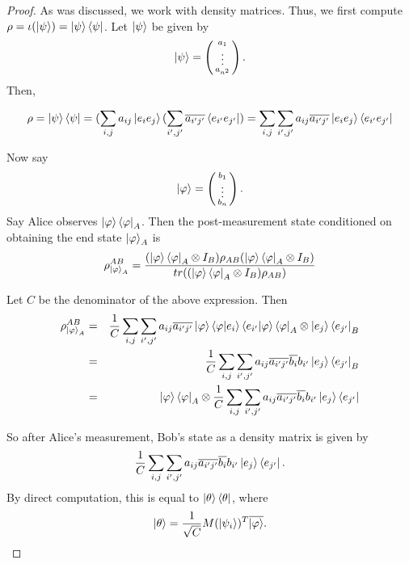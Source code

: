 \begin{proof}
As was discussed, we work with density matrices.  Thus, we first compute $\rho=\iota(\ket{\psi})=\ket{\psi}\bra{\psi}$.  Let $\ket{\psi}$ be given by 
\begin{equation}
\ket{\psi}=\left(\begin{smallmatrix}a_1\\ \vdots \\a_{n^2}\end{smallmatrix}\right).
\end{equation}
Then, 

\begin{equation}
\rho=\ket{\psi}\bra{\psi}=(\sum_{i,j} a_{ij}\ket{e_i e_j}(\sum_{i',j'} \overline{a_{i'j'}}\bra{e_{i'} e_{j'}})=\sum_{i,j} \sum_{i',j'} a_{ij} \overline{a_{i'j'}}\ket{e_i e_j}\bra{e_{i'} e_{j'}}   
\end{equation}

Now say
\begin{equation}
\ket{\varphi}=\left(\begin{smallmatrix}b_1\\ \vdots \\b_n\end{smallmatrix}\right).
\end{equation}
Say Alice observes $\ket{\varphi}\bra{\varphi}_A$.
Then the post-measurement state conditioned on obtaining the end state $\ket{\varphi}_A$ is
\begin{equation}
\rho_{\ket{\varphi}_A}^{AB}=\frac{(\ket{\varphi}\bra{\varphi}_A \otimes I_B)\rho_{AB}(\ket{\varphi}\bra{\varphi}_A \otimes I_B)}{tr((\ket{\varphi}\bra{\varphi}_A \otimes I_B)\rho_{AB})}
\end{equation}

Let $C$ be the denominator of the above expression. Then 
\begin{eqnarray}
\rho_{\ket{\varphi}_A}^{AB}&=&\frac{1}{C} \sum_{i,j} \sum_{{i'}, {j'}} a_{ij} \overline{a_{i'j'}}\ket{\varphi}\braket{\varphi|e_i}\braket{e_{i'}|\varphi}\bra{\varphi}_A \otimes \ket{e_j}\bra{e_{j'}}_B\\
&=&\frac{1}{C} \sum_{i,j} \sum_{{i'}, {j'}} a_{ij} \overline{a_{i'j'}}\overline{b_i}b_{i'}\ket{e_j}\bra{e_{j'}}_B\\
&=&\ket{\varphi}\bra{\varphi}_A \otimes \frac{1}{C} \sum_{i,j} \sum_{{i'}, {j'}} a_{ij} \overline{a_{i'j'}}\overline{b_i}b_{i'}\ket{e_j}\bra{e_{j'}}
\end{eqnarray}

So after Alice's measurement, Bob's state as a density matrix is given by
\begin{equation}
    \frac{1}{C} \sum_{i,j} \sum_{{i'}, {j'}} a_{ij} \overline{a_{i'j'}}\overline{b_i}b_{i'}\ket{e_j}\bra{e_{j'}}.
\end{equation}
By direct computation, this is equal to $\ket{\theta}\bra{\theta}$, where
\begin{equation}
    \ket{\theta}=\frac{1}{\sqrt{C}} M(\ket{\psi_i})^T \overline{\ket{\varphi}}.
\end{equation}


\end{proof}
